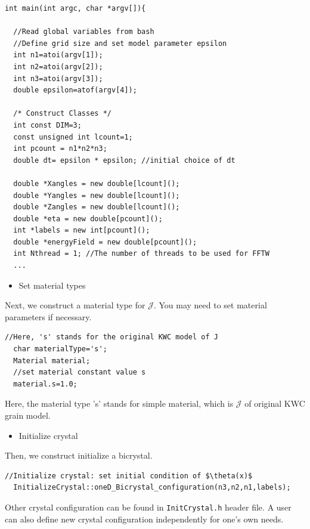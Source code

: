 \documentclass[11pt]{article}
\begin{document}
\begin{tcolorbox}
\begin{lstlisting}[basicstyle=\footnotesize]
int main(int argc, char *argv[]){

  //Read global variables from bash
  //Define grid size and set model parameter epsilon
  int n1=atoi(argv[1]);
  int n2=atoi(argv[2]);
  int n3=atoi(argv[3]);
  double epsilon=atof(argv[4]);

  /* Construct Classes */
  int const DIM=3;
  const unsigned int lcount=1;
  int pcount = n1*n2*n3; 
  double dt= epsilon * epsilon; //initial choice of dt 
	  
  double *Xangles = new double[lcount]();
  double *Yangles = new double[lcount]();
  double *Zangles = new double[lcount]();
  double *eta = new double[pcount]();
  int *labels = new int[pcount]();
  double *energyField = new double[pcount]();
  int Nthread = 1; //The number of threads to be used for FFTW
  ...
\end{lstlisting}
\end{tcolorbox}


\begin{itemize} \item Set material types\end{itemize}

Next, we construct a material type for $\mathcal{J}$. 
You may need to set material parameters if necessary. 
\begin{tcolorbox}
\begin{lstlisting}[basicstyle=\footnotesize]
  //Here, 's' stands for the original KWC model of J
  char materialType='s';
  Material material;
  //set material constant value s 
  material.s=1.0;  
\end{lstlisting}
\end{tcolorbox}
Here, the material type 's' stands for simple material,
which is $\mathcal{J}$ of original KWC grain model.

\begin{itemize} \item Initialize crystal\end{itemize}

Then, we construct initialize a bicrystal. \\
\begin{tcolorbox}
\begin{lstlisting}[basicstyle=\footnotesize]
  //Initialize crystal: set initial condition of $\theta(x)$
  InitializeCrystal::oneD_Bicrystal_configuration(n3,n2,n1,labels);
\end{lstlisting}
\end{tcolorbox}
Other crystal configuration can be found in \texttt{InitCrystal.h} header file.
A user can also define new crystal configuration independently for one's own needs.  
\end{document}
